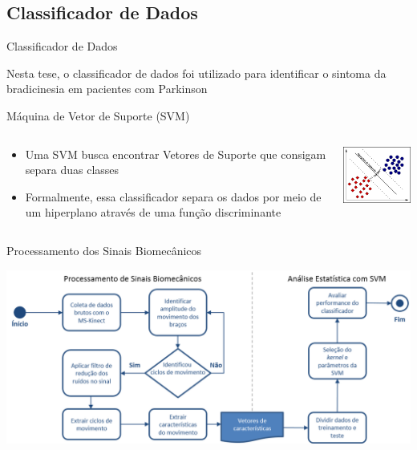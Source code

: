 \documentclass{beamer}
\begin{document}
\subsection{Classificador de Dados}
\begin{frame}{Classificador de Dados}
\begin{block}{}
			Nesta tese, o classificador de dados foi utilizado para identificar o sintoma da bradicinesia em pacientes com Parkinson
			
\end{block}

\end{frame}



\begin{frame}{Máquina de Vetor de Suporte (SVM)}
   \begin{block}{}
   
   \begin{columns}[c]
     \begin{column}{0.5\linewidth}
			 \begin{itemize}
			        \item Uma SVM busca encontrar Vetores de Suporte que consigam separa duas classes
			        

				\item Formalmente, essa classificador separa os dados por meio de um hiperplano através de uma função discriminante
			\end{itemize}
     \end{column}

     \begin{column}{0.5\linewidth}
				\includegraphics[width=4cm]{img/svmhyperplane.png}
    \end{column}
\end{columns}
\end{block}
\end{frame}


\begin{frame}{Processamento dos Sinais Biomecânicos}
  
      \left \includegraphics[height=1.9 in]{img/biomecprocessorh.png}
  
\end{frame}
\end{document}
